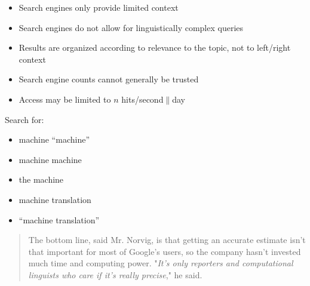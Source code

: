 \documentclass[a4paper,landscape,headrule,footrule,xetex]{foils}
\begin{document}



\begin{itemize}
\item Search engines only provide limited context
\item Search engines do not allow for linguistically complex
queries 
\item Results are organized according to relevance to the
topic, not to left/right context
\item Search engine counts cannot generally be trusted
\item Access may be limited to $n$ hits/second$\|$day
\end{itemize}




Search for:
\begin{itemize}\addtolength{\itemsep}{-1ex}
\item machine \hfill ``machine''
\item machine machine
\item the machine
\item machine translation
\item ``machine translation''
\end{itemize}

\begin{quote}
  The bottom line, said Mr. Norvig, is that getting an accurate
  estimate isn't that important for most of Google's users, so the
  company hasn't invested much time and computing power. "\textit{It's only
  reporters and computational linguists who care if it's really
  precise}," he said.
\end{quote}

\end{document}
